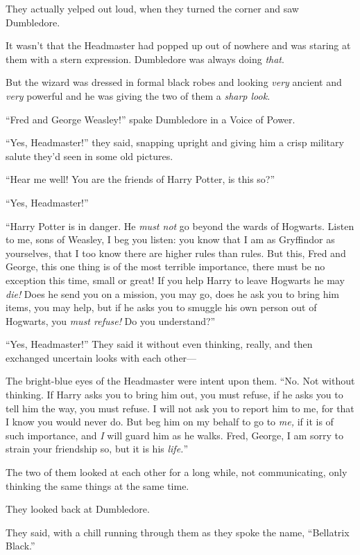 
They actually yelped out loud, when they turned the corner and saw Dumbledore.

It wasn’t that the Headmaster had popped up out of nowhere and was staring at them with a stern expression. Dumbledore was always doing \emph{that}.

But the wizard was dressed in formal black robes and looking \emph{very} ancient and \emph{very} powerful and he was giving the two of them a \emph{sharp look}.

“Fred and George Weasley!” spake Dumbledore in a Voice of Power.

“Yes, Headmaster!” they said, snapping upright and giving him a crisp military salute they’d seen in some old pictures.

“Hear me well! You are the friends of Harry Potter, is this so?”

“Yes, Headmaster!”

“Harry Potter is in danger. He \emph{must not} go beyond the wards of Hogwarts. Listen to me, sons of Weasley, I beg you listen: you know that I am as Gryffindor as yourselves, that I too know there are higher rules than rules. But this, Fred and George, this one thing is of the most terrible importance, there must be no exception this time, small or great! If you help Harry to leave Hogwarts he may \emph{die!} Does he send you on a mission, you may go, does he ask you to bring him items, you may help, but if he asks you to smuggle his own person out of Hogwarts, you \emph{must refuse!} Do you understand?”

“Yes, Headmaster!” They said it without even thinking, really, and then exchanged uncertain looks with each other—

The bright-blue eyes of the Headmaster were intent upon them. “No. Not without thinking. If Harry asks you to bring him out, you must refuse, if he asks you to tell him the way, you must refuse. I will not ask you to report him to me, for that I know you would never do. But beg him on my behalf to go to \emph{me,} if it is of such importance, and \emph{I} will guard him as he walks. Fred, George, I am sorry to strain your friendship so, but it is his \emph{life.}”

The two of them looked at each other for a long while, not communicating, only thinking the same things at the same time.

They looked back at Dumbledore.

They said, with a chill running through them as they spoke the name, “Bellatrix Black.”

